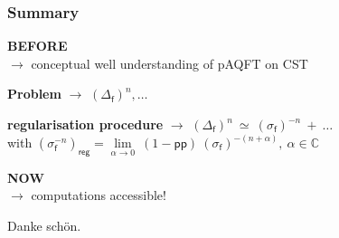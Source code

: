 \documentclass[9pt]{beamer}
\newcommand{\pp}{\mathsf{pp}} %
\newcommand{\Cbb}{\mathbb{C}}
\newcommand{\fsf}{\mathsf{f}}
\begin{document}
{%
  \begin{frame}
    \frametitle{Summary}
    \begin{exampleblock}{\vspace*{-3ex}}
      \centering \textbf{BEFORE} \\ $\to$ conceptual well understanding of pAQFT on CST  
    \end{exampleblock}
    \vspace*{-8pt}
    \begin{exampleblock}{\vspace*{-3ex}}
      \centering \textbf{Problem} $\to$ $(\Delta_\fsf)^n, \dots $
    \end{exampleblock}
    \vspace*{-8pt}
    \begin{exampleblock}{\vspace*{-3ex}}
      \centering \textbf{regularisation procedure} $\to$ $(\Delta_\fsf)^{n} \ \simeq \ (\sigma_\fsf)^{-n} \ + \ \dots$ \\
      with $(\sigma_\fsf^{-n})_{\mathsf{reg}} = \underset{\alpha \to 0}{\lim} \ (1-\pp) \ (\sigma_\fsf)^{-(n+\alpha)}, \ \alpha \in \Cbb$
    \end{exampleblock}
    \vspace*{-8pt}
    \begin{exampleblock}{\vspace*{-3ex}}
      \centering \textbf{NOW} \\ $\to$ computations accessible!
    \end{exampleblock}
    \vspace{12pt}
    \begin{flushright}
      \textcolor{white!80!blue}{Danke schön.}
    \end{flushright}
  \end{frame}
}%
\end{document}
